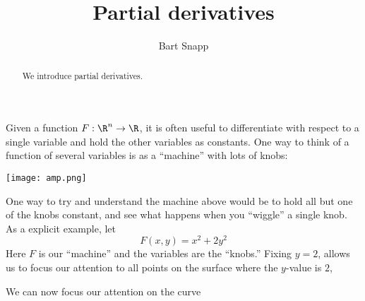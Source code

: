 \documentclass{ximera}
\author{Bart Snapp}
\title[Dig-In:]{Partial derivatives}
\begin{document}
\begin{abstract}
  We introduce partial derivatives. 
\end{abstract}
\maketitle

Given a function $F:\R^n \to \R$, it is often useful to differentiate
with respect to a single variable and hold the other variables as
constants. One way to think of a function of several variables is as a
``machine'' with lots of knobs:
\begin{image}
  \texttt{[image: amp.png]}
\end{image}
One way to try and understand the machine above would be to hold all
but one of the knobs constant, and see what happens when you
``wiggle'' a single knob.  As a explicit example, let
\[
F(x,y) = x^2+2y^2
\]
Here $F$ is our ``machine'' and the variables are the ``knobs.''
Fixing $y=2$, allows us to focus our attention to all points on the
surface where the $y$-value is $2$,
\begin{image}
\end{image}
We can now focus our attention on the curve 
\end{document}
